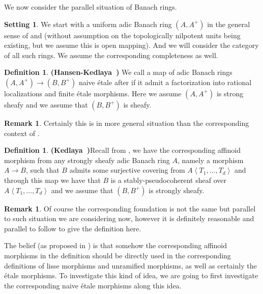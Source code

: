\documentclass[12pt]{amsart}
\theoremstyle{definition}
\newtheorem{definition}[theorem]{Definition}
\newtheorem{remark}[theorem]{Remark}
\numberwithin{equation}{section}
\newtheorem{setting}[theorem]{Setting}
\begin{document}
\noindent We now consider the parallel situation of Banach rings.

\begin{setting}
We start with a uniform adic Banach ring $(A,A^+)$ in the general sense of \cite{KL1} and \cite{KL2} (without assumption on the topologically nilpotent units being existing, but we assume this is open mapping). And we will consider the category of all such rings. We assume the corresponding completeness as well.
\end{setting}


\begin{definition}\mbox{\bf{(Hansen-Kedlaya \cite[Definition 5.1]{HK})}}
We call a map of adic Banach rings $(A,A^+)\rightarrow (B,B^+)$ naive \'etale after \cite[Definition 5.1]{HK} if it admit a factorization into rational localizations and finite \'etale morphisms. Here we assume $(A,A^+)$ is strong sheafy and we assume that $(B,B^+)$ is sheafy.	
\end{definition}


\begin{remark}
Certainly this is in more general situation than the corresponding context of \cite{HK}.	
\end{remark}



\begin{definition}\mbox{\bf{(Kedlaya \cite[Definition A5.2]{Ked1})}}\label{definition2.3}
Recall from \cite[Definition A5.2]{Ked1}, we have the corresponding affinoid morphism from any strongly sheafy adic Banach ring $A$, namely a morphism $A\rightarrow B$, such that $B$ admits some surjective covering from $A\left<T_1,...,T_d\right>$ and through this map we have that $B$ is a stably-pseudocoherent sheaf over $A\left<T_1,...,T_d\right>$ and we assume that $(B,B^+)$ is strongly sheafy.

	
\end{definition}



\begin{remark}
Of course the corresponding foundation is not the same but parallel to such situation we are considering now, however it is definitely reasonable and parallel to follow \cite[Appendix A5]{Ked1} to give the definition here.	
\end{remark}



\indent The belief (as proposed in \cite[Problem A5.3, Problem A5.4]{Ked1}) is that somehow the corresponding affinoid morphisms in the definition should be directly used in the corresponding definitions of lisse morphisms and unramified morphisms, as well as certainly the \'etale morphisms. To investigate this kind of idea, we are going to first investigate the corresponding naive \'etale morphisms along this idea.\\
\end{document}
